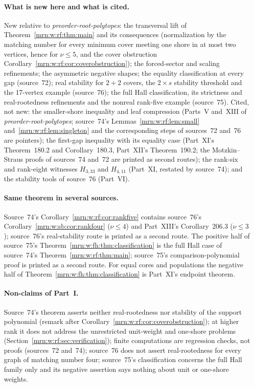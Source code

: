 \documentclass[11pt,a4paper]{article}
\theoremstyle{remark}\newtheorem{remark}[theorem]{Remark}
\newcommand{\prp}{\emph{preorder-root-polytopes}}
\begin{document}
\paragraph{What is new here and what is cited.}
New relative to \prp: the transversal lift of
Theorem~\ref{mrn:w:rf:thm:main} and its consequences (normalization by the
matching number for every minimum cover meeting one shore in at most two
vertices, hence for $\nu\le5$, and the cover obstruction
Corollary~\ref{mrn:w:rf:cor:coverobstruction}); the forced-sector and
scaling refinements; the asymmetric negative shapes; the equality
classification at every gap (source~72); real stability for $2+2$ covers,
the $2\times s$ stability threshold and the 17-vertex example (source~76);
the full Hall classification, its strictness and real-rootedness refinements
and the nonreal rank-five example (source~75). Cited, not new: the
smaller-shore inequality and leaf compression (Parts~V and~XIII of \prp;
source~74's Lemmas~\ref{mrn:w:rf:lem:small} and~\ref{mrn:w:rf:lem:singleton}
and the corresponding steps of sources~72 and~76 are pointers); the first-gap
inequality with its equality case (Part~XI's Theorem~180.2 and
Corollary~180.3, Part~XII's Theorem~190.2; the Motzkin--Straus proofs of
sources~74 and~72 are printed as second routes); the rank-six and rank-eight
witnesses $H_{3,33}$ and $H_{4,11}$ (Part~XI, restated by source~74); and
the stability tools of source~76 (Part~VI).

\paragraph{Same theorem in several sources.}
Source~74's Corollary~\ref{mrn:w:rf:cor:rankfive} contains source~76's
Corollary~\ref{mrn:w:sb:cor:rankfour} ($\nu\le4$) and Part~XIII's
Corollary~206.3 ($\nu\le3$); source~76's real-stability route is printed as a
second route. The positive half of source~75's
Theorem~\ref{mrn:w:fh:thm:classification} is the full Hall case of source~74's
Theorem~\ref{mrn:w:rf:thm:main}; source~75's comparison-polynomial proof is
printed as a second route. For equal cores and populations the negative half
of Theorem~\ref{mrn:w:fh:thm:classification} is Part~XI's endpoint theorem.

\paragraph{Non-claims of Part~I.}
Source~74's theorem asserts neither real-rootedness nor stability of the
support polynomial (remark after
Corollary~\ref{mrn:w:rf:cor:coverobstruction}); at higher rank it does not
address the unrestricted unit-weight and one-shore problems
(Section~\ref{mrn:w:rf:sec:verification}); finite computations are
regression checks, not proofs (sources~72 and~74); source~76 does not assert
real-rootedness for every graph of matching number four; source~75's
classification concerns the full Hall family only and its negative assertion
says nothing about unit or one-shore weights.
\end{document}

